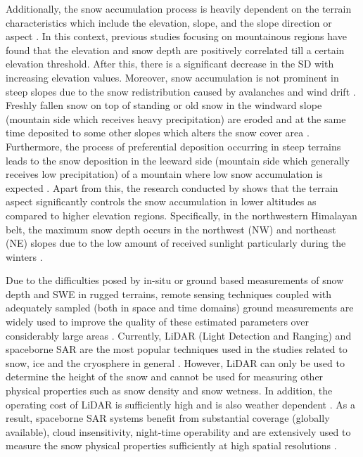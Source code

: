 \documentclass[review]{elsarticle}
\numberwithin{equation}{section}
\numberwithin{figure}{section}
\numberwithin{table}{section}
\begin{document}
Additionally, the snow accumulation process is heavily dependent on the terrain characteristics which include the elevation, slope, and the slope direction or aspect \citep{Grunewald2014, Jain2009, Negi2009, Srinivasulu2004, Zheng2016}. In this context, previous studies focusing on mountainous regions \citep{Grunewald2014, Jain2009} have found that the elevation and snow depth are positively correlated till a certain elevation threshold. After this, there is a significant decrease in the SD with increasing elevation values. Moreover, snow accumulation is not prominent in steep slopes due to the snow redistribution caused by avalanches and wind drift \citep{Grunewald2014}. Freshly fallen snow on top of standing or old snow in the windward slope (mountain side which receives heavy precipitation) are eroded and at the same time deposited to some other slopes which alters the snow cover area \citep{Lehning2008}. Furthermore, the process of preferential deposition occurring in steep terrains leads to the snow deposition in the leeward side (mountain side which generally receives low precipitation) of a mountain where low snow accumulation is expected \citep{Lehning2008}. Apart from this, the research conducted by \cite{Jain2009} shows that the terrain aspect significantly controls the snow accumulation in lower altitudes as compared to higher elevation regions. Specifically, in the northwestern Himalayan belt, the maximum snow depth occurs in the northwest (NW) and northeast (NE) slopes due to the low amount of received sunlight particularly during the winters \citep{Jain2009}.

Due to the difficulties posed by in-situ or ground based measurements of snow depth and SWE in rugged terrains, remote sensing techniques coupled with adequately sampled (both in space and time domains) ground measurements are widely used to improve the quality of these estimated parameters over considerably large areas \citep{Takala2011}. Currently, LiDAR (Light Detection and Ranging) and spaceborne SAR are the most popular techniques used in the studies related to snow, ice and the cryosphere in general \citep{Deems2013, Leinss2014, Tedesco2015}. However, LiDAR can only be used to determine the height of the snow and cannot be used for measuring other physical properties such as snow density and snow wetness. In addition, the operating cost of LiDAR is sufficiently high and is also weather dependent \citep{Deems2013}. As a result, spaceborne SAR systems benefit from substantial coverage (globally available), cloud insensitivity, night-time operability and are extensively used to measure the snow physical properties sufficiently at high spatial resolutions \citep{Moreira2013, Thakur2012}.
\end{document}
